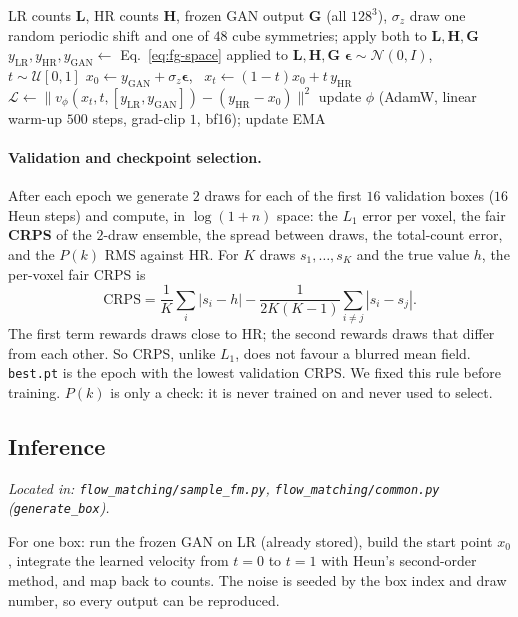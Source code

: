 \begin{algorithm}[H]
\caption{Flow+GAN training step (one box)}
\label{alg:fg-train}
\begin{algorithmic}[1]
\Require LR counts $\mathbf L$, HR counts $\mathbf H$, frozen GAN output $\mathbf G$ (all $128^3$), $\sigma_z$
\State draw one random periodic shift and one of $48$ cube symmetries; apply both to $\mathbf L,\mathbf H,\mathbf G$
\State $y_\text{LR},y_\text{HR},y_\text{GAN}\gets$ Eq.~\ref{eq:fg-space} applied to $\mathbf L,\mathbf H,\mathbf G$
\State $\boldsymbol\epsilon\sim\mathcal N(0,I)$, \ $t\sim\mathcal U[0,1]$
\State $x_0\gets y_\text{GAN}+\sigma_z\boldsymbol\epsilon$, \ $x_t\gets(1-t)x_0+t\,y_\text{HR}$
\State $\mathcal L\gets\big\lVert v_\phi(x_t,t,[y_\text{LR},y_\text{GAN}])-(y_\text{HR}-x_0)\big\rVert^2$ 
\State update $\phi$ (AdamW, linear warm-up $500$ steps, grad-clip $1$, bf16); update EMA
\end{algorithmic}
\end{algorithm}

\paragraph{Validation and checkpoint selection.} After each epoch we generate
$2$ draws for each of the first $16$ validation boxes ($16$ Heun steps) and
compute, in $\log(1+n)$ space: the $L_1$ error per voxel, the fair
\textbf{CRPS} of the $2$-draw ensemble, the spread between draws, the
total-count error, and the $P(k)$ RMS against HR. For $K$ draws $s_1,\dots,s_K$
and the true value $h$, the per-voxel fair CRPS is
\begin{equation}
  \mathrm{CRPS} = \frac1K\sum_{i}|s_i-h| - \frac{1}{2K(K-1)}\sum_{i\neq j}|s_i-s_j| .
  \label{eq:fg-crps}
\end{equation}
The first term rewards draws close to HR; the second rewards draws that differ
from each other. So CRPS, unlike $L_1$, does not favour a blurred mean field.
\texttt{best.pt} is the epoch with the lowest validation CRPS. We fixed this rule
before training. $P(k)$ is only a check: it is never trained on and never used
to select.

\subsection{Inference}
\textit{Located in: \texttt{flow\_matching/sample\_fm.py},
\texttt{flow\_matching/common.py} (\texttt{generate\_box}).}

For one box: run the frozen GAN on LR (already stored), build the start point
$x_0$, integrate the learned velocity from $t=0$ to $t=1$ with Heun's
second-order method, and map back to counts. The noise is seeded by the box index
and draw number, so every output can be reproduced.

